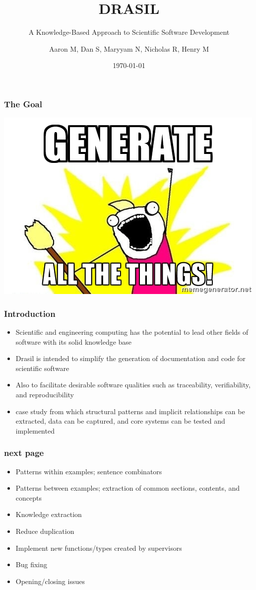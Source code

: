 \documentclass{beamer}
\title{DRASIL}
\subtitle{A Knowledge-Based Approach to Scientific Software Development}
\author{Aaron M, Dan S, Maryyam N, Nicholas R, Henry M}
\institute{McMaster University}
\date{\today}
\begin{document}
\frame{\titlepage}

\begin{frame}
\frametitle{The Goal}
\includegraphics[scale=0.70]{../WG2_11/generate_all_the_things.jpg}
\end{frame}

\begin{frame}
\frametitle{Introduction}
\begin{itemize}
 \item<1-> Scientific and engineering computing has the potential to lead other fields of software with its solid knowledge base
 \item<2-> Drasil is intended to simplify the generation of documentation and code for scientific software
 \item<3-> Also to facilitate desirable software qualities such as traceability, verifiability, and reproducibility
 \item<4-> case study from which structural patterns and implicit relationships can be extracted, data can be captured, and core systems can be tested and implemented
\end{itemize}
\end{frame}

\begin{frame}
\frametitle{next page}
\begin{itemize}
 \item<1-> Patterns within examples; sentence combinators
 \item<2-> Patterns between examples; extraction of common sections, contents, and concepts
 \item<3-> Knowledge extraction
 \item<4-> Reduce duplication
 \item<5-> Implement new functions/types created by supervisors
 \item<6-> Bug fixing
 \item<7-> Opening/closing issues
\end{itemize}
\end{frame}
\end{document}
